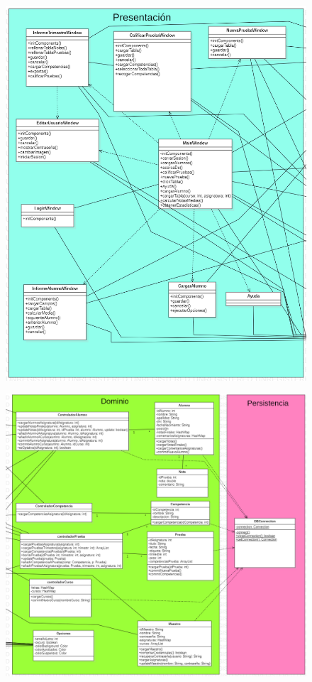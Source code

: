 \begin{figure}[H]
\centering\includegraphics[width=1\linewidth]{figs/ClassDiagramPres.png}
\end{figure}

\begin{figure}[H]
\centering\includegraphics[width=1\linewidth]{figs/ClassDiagramDom.png}
\end{figure}